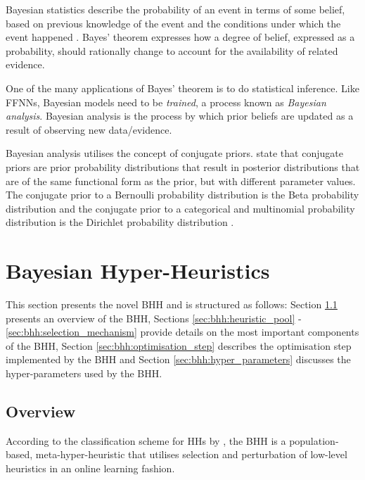 \documentclass[preprint,review,12pt]{elsarticle}
\begin{document}
Bayesian statistics describe the probability of an event in terms of some belief, based on previous knowledge of the event and the conditions under which the event happened \citep{ref:hackenberger:2019}. Bayes' theorem expresses how a degree of belief, expressed as a probability, should rationally change to account for the availability of related evidence.

One of the many applications of Bayes' theorem is to do statistical inference. Like \acp{FFNN}, Bayesian models need to be \textit{trained}, a process known as \textit{Bayesian analysis}. Bayesian analysis is the process by which prior beliefs are updated as a result of observing new data/evidence.

Bayesian analysis utilises the concept of conjugate priors. \citet{ref:wackerly:2014} state that conjugate priors are prior probability distributions that result in posterior distributions that are of the same functional form as the prior, but with different parameter values. The conjugate prior to a Bernoulli probability distribution is the Beta probability distribution and the conjugate prior to a categorical and multinomial probability distribution is the Dirichlet probability distribution \citep{ref:wackerly:2014}.


\section{Bayesian Hyper-Heuristics}
\label{sec:bhh}

This section presents the novel \acs{BHH} and is structured as follows: Section \ref{sec:bhh:overview} presents an overview of the \acs{BHH}, Sections \ref{sec:bhh:heuristic_pool} - \ref{sec:bhh:selection_mechanism} provide details on the most important components of the \acs{BHH}, Section \ref{sec:bhh:optimisation_step} describes the optimisation step implemented by the \acs{BHH} and Section \ref{sec:bhh:hyper_parameters} discusses the hyper-parameters used by the \acs{BHH}.


\subsection{Overview}\label{sec:bhh:overview}

According to the classification scheme for \acp{HH} by \citet{ref:burke:2010}, the \acs{BHH} is a population-based, meta-hyper-heuristic that utilises selection and perturbation of low-level heuristics in an online learning fashion.
\end{document}
